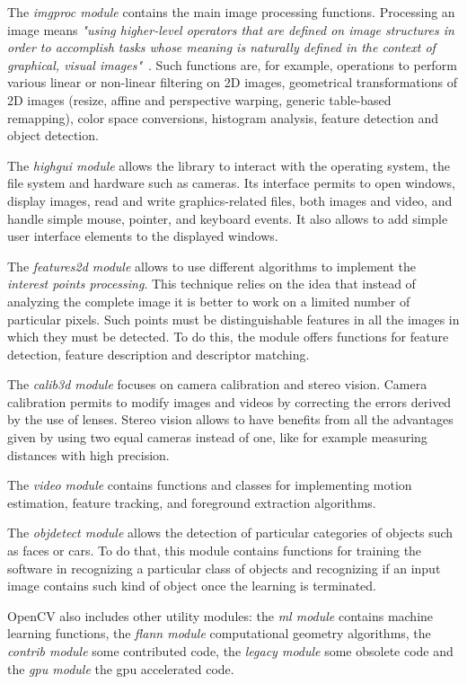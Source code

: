 	The \emph{imgproc module} contains the main image processing functions. Processing an image means \emph{"using higher-level operators that are defined on image structures in order to accomplish tasks whose meaning is naturally defined in the context of graphical, visual images"}~\cite[128]{bradski2008learning}.
	Such functions are, for example, operations to perform various linear or non-linear filtering on 2D images, geometrical transformations of 2D images (resize, affine and perspective warping, generic table-based remapping), color space conversions, histogram analysis, feature detection and object detection.
	
	The \emph{highgui module} allows the library to interact with the operating system, the file system and hardware such as cameras. Its interface permits to open windows, display images, read and write graphics-related files, both images and video, and handle simple mouse, pointer, and keyboard events. It also allows to add simple user interface elements to the displayed windows.   

	The \emph{features2d module} allows to use different algorithms to implement the \emph{interest points processing}. This technique relies on the idea that instead of analyzing the complete image it is better to work on a limited number of particular pixels. Such points must be distinguishable features in all the images in which they must be detected. 
	To do this, the module offers functions for feature detection, feature description and descriptor matching.

	The \emph{calib3d module} focuses on camera calibration and stereo vision. Camera calibration permits to modify images and videos by correcting the errors derived by the use of lenses. Stereo vision allows to have benefits from all the advantages given by using two equal cameras instead of one, like for example measuring distances with high precision.

	The \emph{video module} contains functions and classes for implementing motion estimation, feature tracking, and foreground extraction algorithms.

	 The \emph{objdetect module} allows the detection of particular categories of objects such as faces or cars. To do that, this module contains functions for training the software in recognizing a particular class of objects and recognizing if an input image contains such kind of object once the learning is terminated. 

	\mbox{OpenCV} also includes other utility modules: the \emph{ml module} contains machine learning functions, the \emph{flann module} computational geometry algorithms, the \emph{contrib module} some contributed code, the \emph{legacy module} some obsolete code and the \emph{gpu module} the gpu accelerated code.



